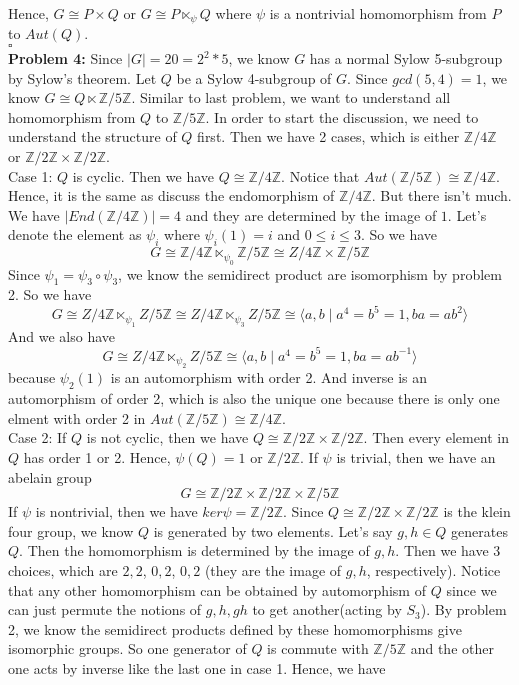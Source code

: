 \documentclass[12pt]{amsart}
\newcommand{\Z}{\mathbb{Z}}
\begin{document}
Hence, $G\cong P\times Q$ or $G\cong P\ltimes_\psi Q$ where $\psi$ is a nontrivial homomorphism from $P$ to $Aut(Q)$.
\\\phantom{qed}\hfill$\square$\\
\textbf{Problem 4:} Since $|G|=20=2^2*5$, we know $G$ has a normal Sylow 5-subgroup by Sylow's theorem. Let $Q$ be a Sylow 4-subgroup of $G$. Since $gcd(5,4)=1$, we know $G\cong Q\ltimes \Z/5\Z$. Similar to last problem, we want to understand all homomorphism from $Q$ to $\Z/5\Z$. In order to start the discussion, we need to understand the structure of $Q$ first. Then we have 2 cases, which is either $\Z/4\Z$ or $\Z/2\Z\times \Z/2\Z$.\\
Case 1: $Q$ is cyclic. Then we have $Q\cong \Z/4\Z$. Notice that $Aut(\Z/5\Z)\cong \Z/4\Z$. Hence, it is the same as discuss the endomorphism of $\Z/4\Z$. But there isn't much. We have $|End(\Z/4\Z)|=4$ and they are determined by the image of $1$. Let's denote the element as $\psi_i$ where $\psi_i(1)=i$ and $0\leq i\leq 3$. So we have
\[G\cong \Z/4\Z\ltimes_{\psi_0}\Z/5\Z\cong Z/4\Z\times \Z/5\Z \]
Since $\psi_1=\psi_3\circ \psi_3$, we know the semidirect product are isomorphism by problem 2. So we have
\[G\cong Z/4\Z\ltimes_{\psi_1}Z/5\Z\cong Z/4\Z\ltimes_{\psi_3} Z/5\Z\cong \langle a,b\mid a^4=b^5=1, ba=ab^2\rangle\]
And we also have
\[G\cong Z/4\Z\ltimes_{\psi_2}Z/5\Z\cong \langle a,b\mid a^4=b^5=1, ba=ab^{-1}\rangle\]
because $\psi_2(1)$ is an automorphism with order 2. And inverse is an automorphism of order 2, which is also the unique one because there is only one elment with order 2 in $Aut(\Z/5\Z)\cong \Z/4\Z$.\\
Case 2: If $Q$ is not cyclic, then we have $Q\cong \Z/2\Z\times \Z/2\Z$. Then every element in $Q$ has order 1 or 2. Hence, $\psi(Q)=1$ or $\Z/2\Z$.
If $\psi$ is trivial, then we have an abelain group
\[G\cong  \Z/2\Z\times \Z/2\Z\times \Z/5\Z \]
If $\psi$ is nontrivial, then we have $ker\psi =\Z/2\Z$. Since $Q\cong\Z/2\Z\times \Z/2\Z$ is the klein four group, we know $Q$ is generated by two elements. Let's say $g,h\in Q$ generates $Q$. Then the homomorphism is determined by the image of $g,h$. Then we have 3 choices, which are $2,2$, $0,2$, $0,2$ (they are the image of $g,h$, respectively). Notice that any other homomorphism can be obtained by automorphism of $Q$ since we can just permute the notions of $g,h, gh$ to get another(acting by $S_3$). By problem 2, we know the semidirect products defined by these homomorphisms give isomorphic groups. So one generator of $Q$ is commute with $\Z/5\Z$ and the other one acts by inverse like the last one in case 1. Hence, we have
\end{document}
